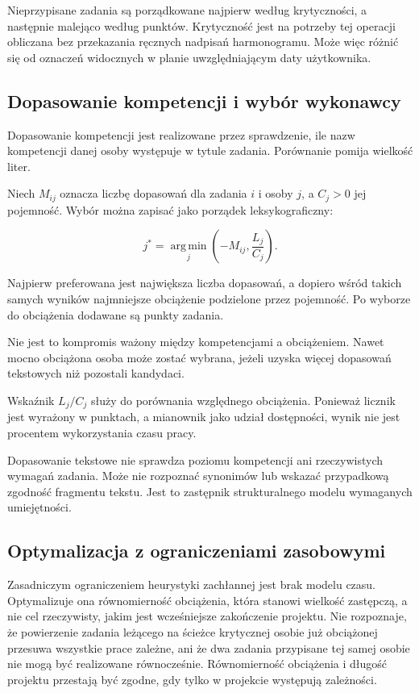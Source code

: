 Nieprzypisane zadania są porządkowane najpierw według krytyczności, a następnie malejąco według punktów. Krytyczność jest na potrzeby tej operacji obliczana bez przekazania ręcznych nadpisań harmonogramu. Może więc różnić się od oznaczeń widocznych w planie uwzględniającym daty użytkownika.

\subsection{Dopasowanie kompetencji i wybór wykonawcy}

Dopasowanie kompetencji jest realizowane przez sprawdzenie, ile nazw kompetencji danej osoby występuje w tytule zadania. Porównanie pomija wielkość liter.

Niech \(M_{ij}\) oznacza liczbę dopasowań dla zadania \(i\) i osoby \(j\), a \(C_j>0\) jej pojemność. Wybór można zapisać jako porządek leksykograficzny:

\begin{equation}
    j^\ast =
    \operatorname*{arg\,min}_{j}
    \left(-M_{ij},\frac{L_j}{C_j}\right).
    \label{eq:przydzial-wybor}
\end{equation}

Najpierw preferowana jest największa liczba dopasowań, a dopiero wśród takich samych wyników najmniejsze obciążenie podzielone przez pojemność. Po wyborze do obciążenia dodawane są punkty zadania.

Nie jest to kompromis ważony między kompetencjami a obciążeniem. Nawet mocno obciążona osoba może zostać wybrana, jeżeli uzyska więcej dopasowań tekstowych niż pozostali kandydaci.

Wskaźnik \(L_j/C_j\) służy do porównania względnego obciążenia. Ponieważ licznik jest wyrażony w punktach, a mianownik jako udział dostępności, wynik nie jest procentem wykorzystania czasu pracy.

Dopasowanie tekstowe nie sprawdza poziomu kompetencji ani rzeczywistych wymagań zadania. Może nie rozpoznać synonimów lub wskazać przypadkową zgodność fragmentu tekstu. Jest to zastępnik strukturalnego modelu wymaganych umiejętności.

\subsection{Optymalizacja z ograniczeniami zasobowymi}
\label{subsec:cpsat}

Zasadniczym ograniczeniem heurystyki zachłannej jest brak modelu czasu. Optymalizuje ona równomierność obciążenia, która stanowi wielkość zastępczą, a nie cel rzeczywisty, jakim jest wcześniejsze zakończenie projektu. Nie rozpoznaje, że powierzenie zadania leżącego na ścieżce krytycznej osobie już obciążonej przesuwa wszystkie prace zależne, ani że dwa zadania przypisane tej samej osobie nie mogą być realizowane równocześnie. Równomierność obciążenia i długość projektu przestają być zgodne, gdy tylko w projekcie występują zależności.

